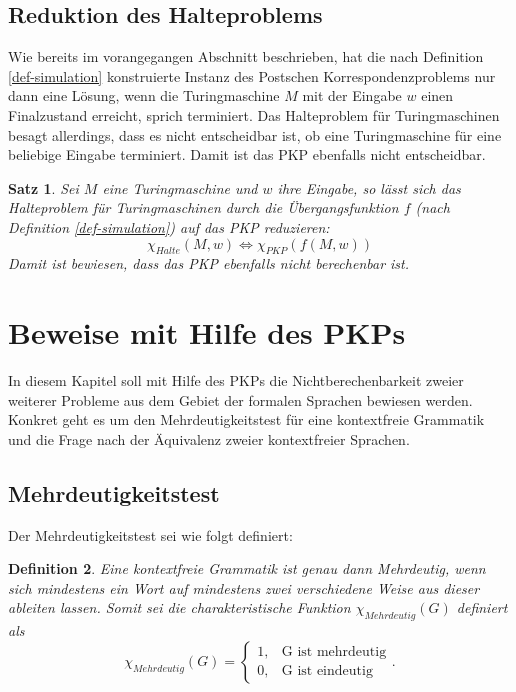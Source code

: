 \documentclass[]{scrartcl}
\newtheorem{definition}{Definition}[section]
\newtheorem{satz}[definition]{Satz}
\begin{document}
	\subsection{Reduktion des Halteproblems}
	
		Wie bereits im vorangegangen Abschnitt beschrieben, hat die nach Definition \ref{def-simulation} konstruierte Instanz des Postschen Korrespondenzproblems nur dann eine Lösung, wenn die Turingmaschine $M$ mit der Eingabe $w$ einen Finalzustand erreicht, sprich terminiert. Das Halteproblem für Turingmaschinen besagt allerdings, dass es nicht entscheidbar ist, ob eine Turingmaschine für eine beliebige Eingabe terminiert. Damit ist das PKP ebenfalls nicht entscheidbar.
		
		\begin{satz}
		Sei $M$ eine Turingmaschine und $w$ ihre Eingabe, so lässt sich das Halteproblem für Turingmaschinen durch die Übergangsfunktion $f$ (nach Definition \ref{def-simulation}) auf das PKP reduzieren:
		\[\chi_{Halte} (M, w) \Leftrightarrow \chi_{PKP}(f(M, w))\]
		Damit ist bewiesen, dass das PKP ebenfalls nicht berechenbar ist.
		\end{satz}

\section{Beweise mit Hilfe des PKPs}

	In diesem Kapitel soll mit Hilfe des PKPs die Nichtberechenbarkeit zweier weiterer Probleme aus dem Gebiet der formalen Sprachen bewiesen werden. Konkret geht es um den Mehrdeutigkeitstest für eine kontextfreie Grammatik und die Frage nach der Äquivalenz zweier kontextfreier Sprachen.
	
	\subsection{Mehrdeutigkeitstest}
	\label{subsec-mehrdeutigkeit}
		
		Der Mehrdeutigkeitstest sei wie folgt definiert:
		\begin{definition}
			Eine kontextfreie Grammatik ist genau dann Mehrdeutig, wenn sich mindestens ein Wort auf mindestens zwei verschiedene Weise aus dieser ableiten lassen. Somit sei die charakteristische Funktion $\chi_{Mehrdeutig}(G)$ definiert als
			  \[
			     \chi_{Mehrdeutig}(G)=\left\{\begin{array}{ll} 1, & \text{G ist mehrdeutig} \\
			         0, &\text{G ist eindeutig}\end{array}\right. .
			  \]
		\end{definition}
		
\end{document}
